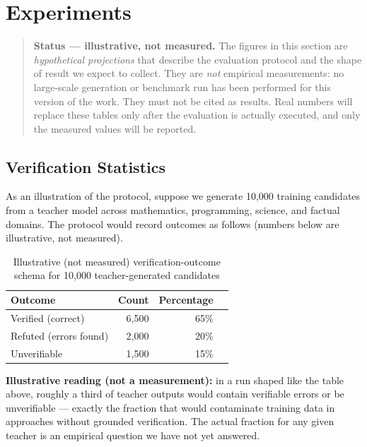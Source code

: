 \documentclass[11pt,a4paper]{article}
\begin{document}
\section{Experiments}
\label{sec:experiments}

\begin{quote}
\textbf{Status --- illustrative, not measured.} The figures in this section are
\emph{hypothetical projections} that describe the evaluation protocol and the
shape of result we expect to collect. They are \emph{not} empirical measurements:
no large-scale generation or benchmark run has been performed for this version of
the work. They must not be cited as results. Real numbers will replace these
tables only after the evaluation is actually executed, and only the measured
values will be reported.
\end{quote}

\subsection{Verification Statistics}

As an illustration of the protocol, suppose we generate 10,000 training candidates from a teacher model across mathematics, programming, science, and factual domains. The protocol would record outcomes as follows (numbers below are illustrative, not measured).

\begin{table}[h]
\centering
\caption{Illustrative (not measured) verification-outcome schema for 10,000 teacher-generated candidates}
\label{tab:verification}
\begin{tabular}{lrrr}
\toprule
\textbf{Outcome} & \textbf{Count} & \textbf{Percentage} \\
\midrule
Verified (correct) & 6,500 & 65\% \\
Refuted (errors found) & 2,000 & 20\% \\
Unverifiable & 1,500 & 15\% \\
\bottomrule
\end{tabular}
\end{table}

\textbf{Illustrative reading (not a measurement):} in a run shaped like the table above, roughly a third of teacher outputs would contain verifiable errors or be unverifiable --- exactly the fraction that would contaminate training data in approaches without grounded verification. The actual fraction for any given teacher is an empirical question we have not yet answered.
\end{document}
